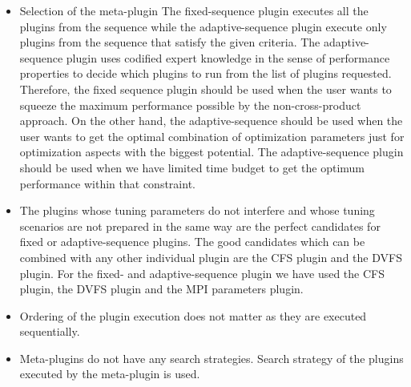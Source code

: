 
\begin{itemize}
	\item Selection of the meta-plugin
	The fixed-sequence plugin executes all the plugins from the sequence while the adaptive-sequence plugin execute only plugins from the sequence that satisfy the given criteria.
The adaptive-sequence plugin uses codified expert knowledge in the sense of performance properties to decide which plugins to run from the list of plugins requested.
Therefore, the fixed sequence plugin should be used when the user wants to squeeze the maximum performance possible by the non-cross-product approach. On the other hand, the adaptive-sequence should be used when the user wants to get the optimal combination of optimization parameters just for optimization aspects with the biggest potential.
The adaptive-sequence plugin should be used when we have limited time budget to get the optimum performance within that constraint. 


	\item The plugins whose tuning parameters do not interfere and whose tuning scenarios are not prepared in the same way are the perfect candidates for fixed or adaptive-sequence plugins.
The good candidates which can be combined with any other individual plugin are the CFS plugin and the DVFS plugin. For the fixed- and adaptive-sequence plugin we have used the CFS plugin, the DVFS plugin and the MPI parameters plugin. 

	\item Ordering of the plugin execution does not matter as they are executed sequentially.  
	
	\item Meta-plugins do not have any search strategies. Search strategy of the plugins executed by the meta-plugin is used.
\end{itemize}
